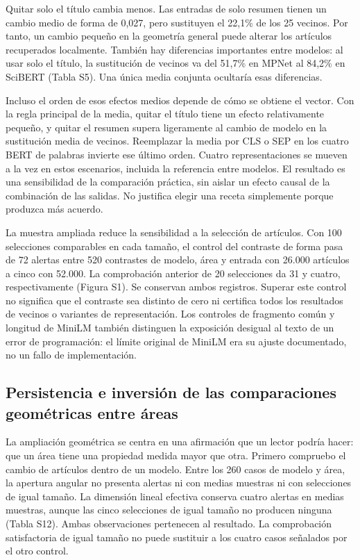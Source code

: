 \documentclass[12pt]{article}
\begin{document}
Quitar solo el título cambia menos. Las entradas de solo resumen tienen un cambio medio de forma de 0,027, pero sustituyen el 22,1\% de los 25 vecinos. Por tanto, un cambio pequeño en la geometría general puede alterar los artículos recuperados localmente. También hay diferencias importantes entre modelos: al usar solo el título, la sustitución de vecinos va del 51,7\% en MPNet al 84,2\% en SciBERT (Tabla S5). Una única media conjunta ocultaría esas diferencias.

Incluso el orden de esos efectos medios depende de cómo se obtiene el vector. Con la regla principal de la media, quitar el título tiene un efecto relativamente pequeño, y quitar el resumen supera ligeramente al cambio de modelo en la sustitución media de vecinos. Reemplazar la media por CLS o SEP en los cuatro BERT de palabras invierte ese último orden. Cuatro representaciones se mueven a la vez en estos escenarios, incluida la referencia entre modelos. El resultado es una sensibilidad de la comparación práctica, sin aislar un efecto causal de la combinación de las salidas. No justifica elegir una receta simplemente porque produzca más acuerdo.

La muestra ampliada reduce la sensibilidad a la selección de artículos. Con 100 selecciones comparables en cada tamaño, el control del contraste de forma pasa de 72 alertas entre 520 contrastes de modelo, área y entrada con 26.000 artículos a cinco con 52.000. La comprobación anterior de 20 selecciones da 31 y cuatro, respectivamente (Figura S1). Se conservan ambos registros. Superar este control no significa que el contraste sea distinto de cero ni certifica todos los resultados de vecinos o variantes de representación. Los controles de fragmento común y longitud de MiniLM también distinguen la exposición desigual al texto de un error de programación: el límite original de MiniLM era su ajuste documentado, no un fallo de implementación.

\subsection{Persistencia e inversión de las comparaciones geométricas entre áreas}
La ampliación geométrica se centra en una afirmación que un lector podría hacer: que un área tiene una propiedad medida mayor que otra. Primero compruebo el cambio de artículos dentro de un modelo. Entre los 260 casos de modelo y área, la apertura angular no presenta alertas ni con medias muestras ni con selecciones de igual tamaño. La dimensión lineal efectiva conserva cuatro alertas en medias muestras, aunque las cinco selecciones de igual tamaño no producen ninguna (Tabla S12). Ambas observaciones pertenecen al resultado. La comprobación satisfactoria de igual tamaño no puede sustituir a los cuatro casos señalados por el otro control.
\end{document}
